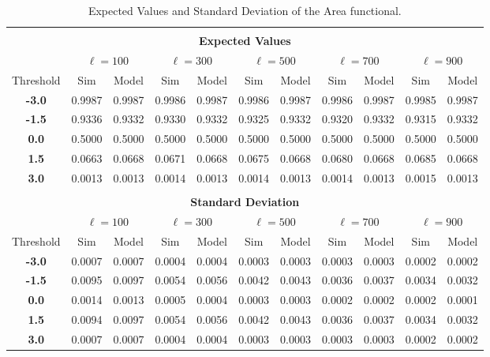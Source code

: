 \documentclass[aps,prd,showpacs,superscriptaddress,groupedaddress]{revtex4-1}  %
\begin{document}
\begin{table}
\centering
\begin{tabular}{|c||c|c|c|c|c|c|c|c|c|c|}

\multicolumn{11}{c}{} \\ 
\multicolumn{11}{c}{\textbf{Expected Values}} \\ 
\hline 
& \multicolumn{2}{c|}{$\ell=100$} & \multicolumn{2}{c|}{$\ell=300$} & \multicolumn{2}{c|}{$\ell=500$} & \multicolumn{2}{c|}{$\ell=700$} & \multicolumn{2}{c|}{$\ell=900$}\\ 
 \hline
Threshold & Sim & Model & Sim & Model & Sim & Model & Sim & Model & Sim & Model\\ 
 \hline
\textbf{-3.0} & 0.9987 & 0.9987 & 0.9986 & 0.9987 & 0.9986 & 0.9987 & 0.9986 & 0.9987 & 0.9985 & 0.9987\\
\textbf{-1.5} & 0.9336 & 0.9332 & 0.9330 & 0.9332 & 0.9325 & 0.9332 & 0.9320 & 0.9332 & 0.9315 & 0.9332\\
\textbf{0.0} & 0.5000 & 0.5000 & 0.5000 & 0.5000 & 0.5000 & 0.5000 & 0.5000 & 0.5000 & 0.5000 & 0.5000\\
\textbf{1.5} & 0.0663 & 0.0668 & 0.0671 & 0.0668 & 0.0675 & 0.0668 & 0.0680 & 0.0668 & 0.0685 & 0.0668\\
\textbf{3.0} & 0.0013 & 0.0013 & 0.0014 & 0.0013 & 0.0014 & 0.0013 & 0.0014 & 0.0013 & 0.0015 & 0.0013\\


\hline 
\multicolumn{11}{c}{} \\ 
\multicolumn{11}{c}{\textbf{Standard Deviation}} \\ 
\hline 
& \multicolumn{2}{c|}{$\ell=100$} & \multicolumn{2}{c|}{$\ell=300$} & \multicolumn{2}{c|}{$\ell=500$} & \multicolumn{2}{c|}{$\ell=700$} & \multicolumn{2}{c|}{$\ell=900$}\\ 
 \hline
Threshold & Sim & Model & Sim & Model & Sim & Model & Sim & Model & Sim & Model\\ 
 \hline
\textbf{-3.0} & 0.0007 & 0.0007 & 0.0004 & 0.0004 & 0.0003 & 0.0003 & 0.0003 & 0.0003 & 0.0002 & 0.0002\\
\textbf{-1.5} & 0.0095 & 0.0097 & 0.0054 & 0.0056 & 0.0042 & 0.0043 & 0.0036 & 0.0037 & 0.0034 & 0.0032\\
\textbf{0.0} & 0.0014 & 0.0013 & 0.0005 & 0.0004 & 0.0003 & 0.0003 & 0.0002 & 0.0002 & 0.0002 & 0.0001\\
\textbf{1.5} & 0.0094 & 0.0097 & 0.0054 & 0.0056 & 0.0042 & 0.0043 & 0.0036 & 0.0037 & 0.0034 & 0.0032\\
\textbf{3.0} & 0.0007 & 0.0007 & 0.0004 & 0.0004 & 0.0003 & 0.0003 & 0.0003 & 0.0003 & 0.0002 & 0.0002\\

\hline 
\end{tabular} \\
\caption{Expected Values and Standard Deviation of the Area functional.} \\
\label{tab:area_mean_rms} \\
\end{table}
\end{document}
